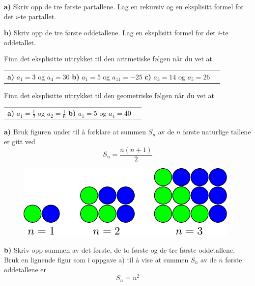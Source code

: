 



\eqlen
\opgt
\setcounter{section}{1}	

\textbf{a)} Skriv opp de tre første partallene. Lag en rekursiv og en eksplisitt formel for det $ i $-te partallet.\os
	
\textbf{b)} Skriv opp de tre første oddetallene. Lag en eksplisitt formel for det $ i $-te oddetallet. 

Finn det eksplisitte uttrykket til  den aritmetiske følgen når du vet at\os
\begin{tabular}{@{}l l}	
	\textbf{a)} $ a_1=3 $ og $ a_4 = 30 $ \os 
	\textbf{b)} $ a_1 = 5 $ og $ a_{11} = -25 $ \os
	\textbf{c)} $ a_3 =14 $ og $ a_5=26 $ 
\end{tabular}\os

Finn det eksplisitte uttrykket til den geometriske følgen når du vet at\os
\begin{tabular}{@{}l l}	
	\textbf{a)} $ a_1=\frac{1}{2} $ og $ a_2 = \frac{1}{6} $ \os 
	\textbf{b)} $ a_1 = 5 $ og $ a_4 = 40 $
\end{tabular} \os

\nes

\textbf{a)} Bruk figuren under til å forklare at summen $ S_n $ av de $ n $ første naturlige tallene er gitt ved
\[S_n=\frac{n(n+1)}{2}  \]

\begin{figure}
	\centering
	\includegraphics[]{../../asymptote/sum}
\end{figure}\vs
\textbf{b)} Skriv opp summen av det første, de to første og de tre første  oddetallene. Bruk en lignende figur som i oppgave a) til å vise at summen $ S_n $ av de $ n $ første oddetallene er
\[ S_n = n^2 \] 


